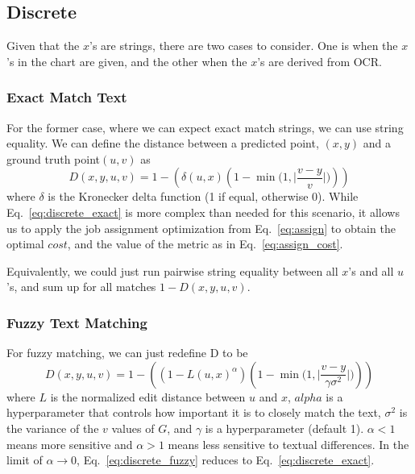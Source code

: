 \documentclass[a4paper,11pt]{scrartcl}
\begin{document}
\subsection{Discrete}

Given that the $x$'s are strings, there are two cases to consider.
One is when the $x$'s in the chart are given, and the other when the $x$'s are derived from OCR.

\subsubsection{Exact Match Text}
\label{sec:discrete_exact}

For the former case, where we can expect exact match strings, we can use string equality.
We can define the distance between a predicted point, $(x, y)$ and a ground truth point$(u, v)$ as
\begin{equation} \label{eq:discrete_exact}
D(x,y,u,v) = 1 - (\delta(u, x) (1 - \min \Big(1, \Big| \frac{v - y}{v} \Big| \Big)))
\end{equation}
where $\delta$ is the Kronecker delta function (1 if equal, otherwise 0).
While Eq.~\ref{eq:discrete_exact} is more complex than needed for this scenario, it allows us to apply the job assignment optimization from Eq.~\ref{eq:assign} to obtain the optimal $cost$, and the value of the metric as in Eq.~\ref{eq:assign_cost}.

Equivalently, we could just run pairwise string equality between all $x$'s and all $u$'s, and sum up for all matches $1 - D(x,y,u,v)$.

\subsubsection{Fuzzy Text Matching}

For fuzzy matching, we can just redefine D to be
\begin{equation} \label{eq:discrete_fuzzy}
D(x,y,u,v) = 1 - ((1 - L(u, x)^\alpha) (1 - \min \Big(1, \Big| \frac{v - y}{\gamma\sigma^2} \Big| \Big)))
\end{equation}
where $L$ is the normalized edit distance between $u$ and $x$, $alpha$ is a hyperparameter that controls how important it is to closely match the text, $\sigma^2$ is the variance of the $v$ values of $G$, and $\gamma$ is a hyperparameter (default 1).
$\alpha < 1$ means more sensitive and $\alpha > 1$ means less sensitive to textual differences.
In the limit of  $\alpha \rightarrow 0$, Eq.~\ref{eq:discrete_fuzzy} reduces to Eq.~\ref{eq:discrete_exact}.
\end{document}
